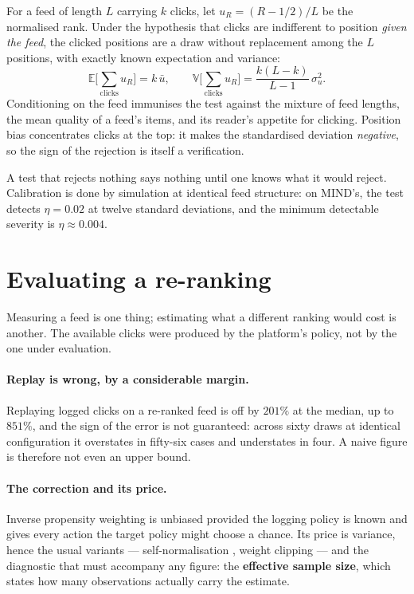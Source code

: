 \documentclass[11pt,a4paper]{article}
\begin{document}
For a feed of length $L$ carrying $k$ clicks, let $u_R = (R - 1/2)/L$ be the normalised rank.
Under the hypothesis that clicks are indifferent to position \emph{given the feed}, the clicked
positions are a draw without replacement among the $L$ positions, with exactly known expectation
and variance:
\begin{equation}
\mathbb{E}\Big[\sum_{\text{clicks}} u_R\Big] = k\,\bar{u}, \qquad
\mathbb{V}\Big[\sum_{\text{clicks}} u_R\Big] = \frac{k(L-k)}{L-1}\,\sigma^2_u .
\label{eq:exchangeability}
\end{equation}
Conditioning on the feed immunises the test against the mixture of feed lengths, the mean
quality of a feed's items, and its reader's appetite for clicking. Position bias concentrates
clicks at the top: it makes the standardised deviation \emph{negative}, so the sign of the
rejection is itself a verification.

A test that rejects nothing says nothing until one knows what it would reject. Calibration is
done by simulation at identical feed structure: on MIND's, the test detects $\eta = 0.02$ at
twelve standard deviations, and the minimum detectable severity is $\eta \approx 0.004$.

\section{Evaluating a re-ranking}
\label{sec:evaluation}

Measuring a feed is one thing; estimating what a different ranking would cost is another. The
available clicks were produced by the platform's policy, not by the one under evaluation.

\paragraph{Replay is wrong, by a considerable margin.} Replaying logged clicks on a re-ranked
feed is off by $201\%$ at the median, up to $851\%$, and the sign of the error is not
guaranteed: across sixty draws at identical configuration it overstates in fifty-six cases and
understates in four. A naive figure is therefore not even an upper bound.

\paragraph{The correction and its price.} Inverse propensity weighting is unbiased provided the
logging policy is known and gives every action the target policy might choose a chance. Its
price is variance, hence the usual variants --- self-normalisation \citep{swaminathan2015},
weight clipping --- and the diagnostic that must accompany any figure: the \textbf{effective
sample size}, which states how many observations actually carry the estimate.
\end{document}
